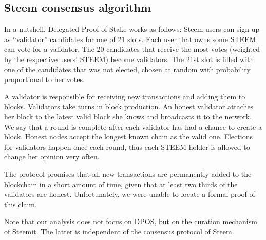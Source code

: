 



  \subsection{Steem consensus algorithm}
    In a nutshell,   Delegated Proof of Stake
    \cite{steemdpos,bitsharesdpos,steem} works as follows: Steem users can sign
    up as ``validator'' candidates for one of 21 slots. Each user that owns some
    STEEM can vote for a validator. The 20 candidates that receive the most votes
    (weighted by the respective users' STEEM) become validators. The 21st slot
    is filled with one of the candidates that was not elected, chosen at random
    with probability proportional to her votes.

    A validator is responsible for receiving new transactions and adding them to
    blocks. Validators take turns in block production. An honest validator
    attaches her block to the latest valid block she knows and broadcasts it to
    the network. We say that a round is complete after each validator has had a
    chance to create a block. Honest nodes accept the longest known chain as the
    valid one. Elections for validators happen once each round, thus each STEEM
    holder is allowed to change her opinion very often.

    The protocol promises that all new transactions are permanently added to the
    blockchain in a short amount of time, given that at least two thirds of the
    validators are honest. Unfortunately, we were unable to locate a formal
    proof of this claim.

    Note that our analysis does not focus on DPOS, but on the curation mechanism
    of Steemit. The latter is independent of the consensus protocol of Steem.
